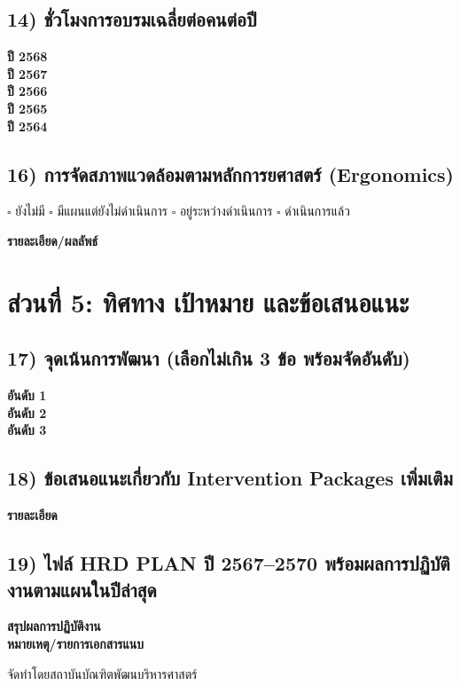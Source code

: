 \documentclass[12pt,a4paper]{article}
\newcommand{\linefield}[1]{\textbf{#1} \hrulefill}
\newcommand{\boxitem}[1]{\(\square\) #1}
\begin{document}
\subsection*{14) ชั่วโมงการอบรมเฉลี่ยต่อคนต่อปี}
\linefield{ปี 2568}\\
\linefield{ปี 2567}\\
\linefield{ปี 2566}\\
\linefield{ปี 2565}\\
\linefield{ปี 2564}

\subsection*{16) การจัดสภาพแวดล้อมตามหลักการยศาสตร์ (Ergonomics)}
\boxitem{ยังไม่มี} \hspace{1.5em}
\boxitem{มีแผนแต่ยังไม่ดำเนินการ} \hspace{1.5em}
\boxitem{อยู่ระหว่างดำเนินการ} \hspace{1.5em}
\boxitem{ดำเนินการแล้ว}

\linefield{รายละเอียด/ผลลัพธ์}\\[2.2em]

\section*{ส่วนที่ 5: ทิศทาง เป้าหมาย และข้อเสนอแนะ}
\subsection*{17) จุดเน้นการพัฒนา (เลือกไม่เกิน 3 ข้อ พร้อมจัดอันดับ)}
\linefield{อันดับ 1}\\
\linefield{อันดับ 2}\\
\linefield{อันดับ 3}

\subsection*{18) ข้อเสนอแนะเกี่ยวกับ Intervention Packages เพิ่มเติม}
\linefield{รายละเอียด}\\[2.2em]

\subsection*{19) ไฟล์ HRD PLAN ปี 2567--2570 พร้อมผลการปฏิบัติงานตามแผนในปีล่าสุด}
\linefield{สรุปผลการปฏิบัติงาน}\\[2.2em]
\linefield{หมายเหตุ/รายการเอกสารแนบ}

\vfill
{\small จัดทำโดยสถาบันบัณฑิตพัฒนบริหารศาสตร์}
\end{document}
